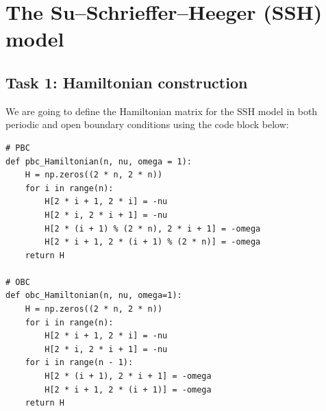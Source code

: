\documentclass{report}
\begin{document}
\chapter{The Su–Schrieffer–Heeger (SSH) model}
\section{Task 1: Hamiltonian construction}
\setcounter{tcb@cnt@question}{0}



\sol We are going to define the Hamiltonian matrix for the SSH model in both periodic and open boundary conditions using the code block below:

\begin{lstlisting}
# PBC 
def pbc_Hamiltonian(n, nu, omega = 1):
    H = np.zeros((2 * n, 2 * n))
    for i in range(n):
        H[2 * i + 1, 2 * i] = -nu
        H[2 * i, 2 * i + 1] = -nu
        H[2 * (i + 1) % (2 * n), 2 * i + 1] = -omega
        H[2 * i + 1, 2 * (i + 1) % (2 * n)] = -omega
    return H

# OBC
def obc_Hamiltonian(n, nu, omega=1):
    H = np.zeros((2 * n, 2 * n))
    for i in range(n):
        H[2 * i + 1, 2 * i] = -nu
        H[2 * i, 2 * i + 1] = -nu
    for i in range(n - 1):
        H[2 * (i + 1), 2 * i + 1] = -omega
        H[2 * i + 1, 2 * (i + 1)] = -omega
    return H
\end{lstlisting}
\end{document}

